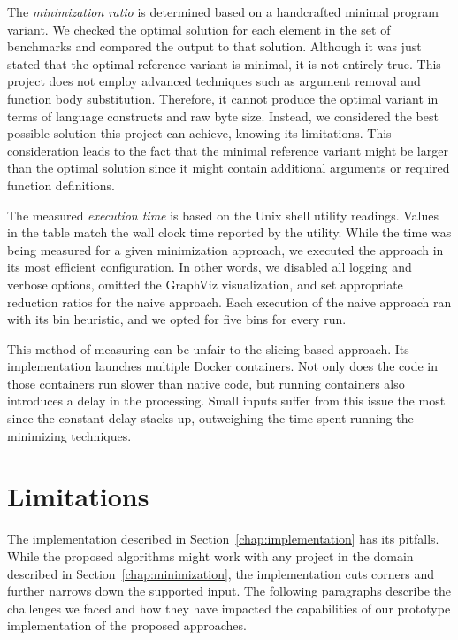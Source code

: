 The \emph{minimization ratio} is determined based on a handcrafted minimal 
program variant. 
We checked the optimal solution for each element in the set of benchmarks and 
compared the output to that solution. 
Although it was just stated that the optimal reference variant is minimal, 
it is not entirely true. 
This project does not employ advanced techniques such as argument removal 
and function body substitution. 
Therefore, it cannot produce the optimal variant in terms of language 
constructs and raw byte size. 
Instead, we considered the best possible solution this project can achieve, 
knowing its limitations. 
This consideration leads to the fact that the minimal reference variant 
might be larger than the optimal solution since it might contain additional 
arguments or required function definitions.

The measured \emph{execution time} is based on the  Unix shell 
utility readings. 
Values in the table match the wall clock time reported by the utility. 
While the time was being measured for a given minimization approach, we 
executed the approach in its most efficient configuration. 
In other words, we disabled all logging and verbose options, omitted 
the GraphViz visualization, and set appropriate reduction ratios for 
the naive approach. 
Each execution of the naive approach ran with its bin heuristic, and we 
opted for five bins for every run. 

This method of measuring can be unfair to the slicing-based approach. 
Its implementation launches multiple Docker containers. 
Not only does the code in those containers run slower than native code, 
but running containers also introduces a delay in the processing. 
Small inputs suffer from this issue the most since the constant delay stacks 
up, outweighing the time spent running the minimizing techniques.

\section{Limitations}\label{chap:limitations}

The implementation described in Section~\ref{chap:implementation} has its 
pitfalls. 
While the proposed algorithms might work with any project in the domain 
described in Section~\ref{chap:minimization}, the implementation cuts corners 
and further narrows down the supported input. 
The following paragraphs describe the challenges we faced and how they have 
impacted the capabilities of our prototype implementation of the proposed 
approaches.

